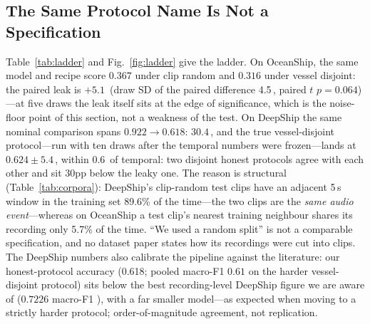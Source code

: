 ﻿\documentclass[journal]{IEEEtran}
\newcommand{\pp}{\,\text{pp}}
\begin{document}
\subsection{The Same Protocol Name Is Not a Specification}
Table~\ref{tab:ladder} and Fig.~\ref{fig:ladder} give the ladder. On OceanShip, the same model and
recipe score $0.367$ under clip random and $0.316$ under vessel disjoint: the paired leak is
$+5.1$\pp{} (draw SD of the paired difference 4.5\pp, paired $t$ $p=0.064$)---at five draws the
leak itself sits at the edge of significance, which is the noise-floor point of this section, not
a weakness of the test. On DeepShip the same nominal comparison
spans $0.922 \to 0.618$: $30.4$\pp, and the true vessel-disjoint protocol---run with ten draws
after the temporal numbers were frozen---lands at $0.624\pm5.4$\pp, within $0.6$\pp{} of
temporal: two disjoint honest protocols agree with each other and sit $30$pp below the leaky
one. The reason is structural (Table~\ref{tab:corpora}): DeepShip's
clip-random test clips have an adjacent 5\,s window in the training set 89.6\% of the time---the
two clips are the \emph{same audio event}---whereas on OceanShip a test clip's nearest training
neighbour shares its recording only 5.7\% of the time. ``We used a random split'' is not a
comparable specification, and no dataset paper states how its recordings were cut into clips.
The DeepShip numbers also calibrate the pipeline against the literature: our honest-protocol
accuracy (0.618; pooled macro-F1 $0.61$ on the harder vessel-disjoint protocol) sits below the
best recording-level DeepShip figure we are aware of ($0.7226$ macro-F1 \cite{soti2026}), with a
far smaller model---as expected when moving to a strictly harder protocol; order-of-magnitude
agreement, not replication.
\end{document}
